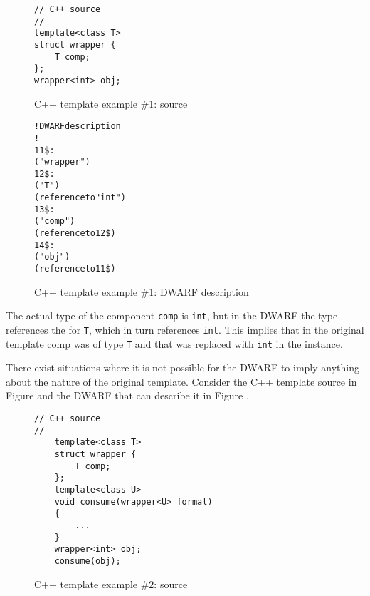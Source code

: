 \begin{figure}[h]
\begin{lstlisting}
// C++ source
//
template<class T>
struct wrapper {
    T comp;
};
wrapper<int> obj;
\end{lstlisting}
\caption{C++ template example \#1: source}
\label{fig:ctemplateexample1source}
\end{figure}

\begin{figure}[h]
\begin{dwflisting}
\begin{alltt}
! DWARF description
!
11\$: 
        ("wrapper")
12\$:    
            ("T")
            (reference to "int")
13\$:    
            ("comp")
            (reference to 12\$)
14\$: 
        ("obj")
        (reference to 11\$)
\end{alltt}
\end{dwflisting}
\caption{C++ template example \#1: DWARF description}
\label{fig:ctemplateexample1dwarf}
\end{figure}

The actual type of the component \texttt{comp} is \texttt{int}, but in the DWARF
the type references the
for \texttt{T}, which in turn references \texttt{int}. This implies that in the
original template comp was of type \texttt{T} and that was replaced
with \texttt{int} in the instance. 

There exist situations where it is
not possible for the DWARF to imply anything about the nature
of the original template. 
Consider the C++ template source in
Figure 
and the DWARF that can describe it in
Figure .

\begin{figure}[!h]
\begin{lstlisting}
// C++ source
//
    template<class T>
    struct wrapper {
        T comp;
    };
    template<class U>
    void consume(wrapper<U> formal)
    {
        ...
    }
    wrapper<int> obj;
    consume(obj);
\end{lstlisting}
\caption{C++ template example \#2: source}
\label{fig:ctemplateexample2source}
\end{figure}

